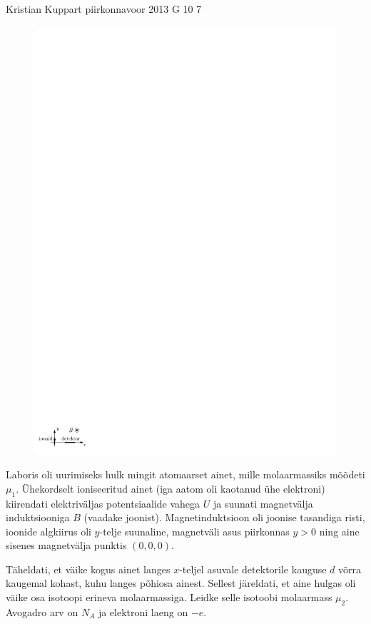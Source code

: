 {Kristian Kuppart} %
{piirkonnavoor} %
{2013} %
{G 10} %
{7} %
{
\ifStatement
\begin{figure}%
\includegraphics[width=\linewidth]{2013-v2g-10-massspektromeeter_ipe}%
\end{figure}
Laboris oli uurimiseks hulk mingit atomaarset ainet, mille molaarmassiks mõõdeti
$\mu_{1}$. Ühekordselt ioniseeritud ainet (iga aatom oli kaotanud ühe
elektroni) kiirendati elektriväljas potentsiaalide vahega $U$ ja suunati magnetvälja
induktsiooniga $B$ (vaadake joonist). Magnetinduktsioon oli joonise tasandiga
risti, 
ioonide algkiirus oli $y$-telje suunaline,
magnetväli asus piirkonnas $y>0$ ning aine sisenes magnetvälja punktis
$(0, 0, 0)$.

Täheldati, et väike kogus  ainet langes $x$-teljel asuvale
detektorile kauguse
$d$ võrra kaugemal kohast, kuhu langes põhiosa ainest. Sellest järeldati,
et aine hulgas oli väike osa isotoopi erineva molaarmassiga. Leidke
selle isotoobi molaarmass $\mu_{2}$. Avogadro arv on $N_A$ ja elektroni laeng
on $-e$.
\fi


}
